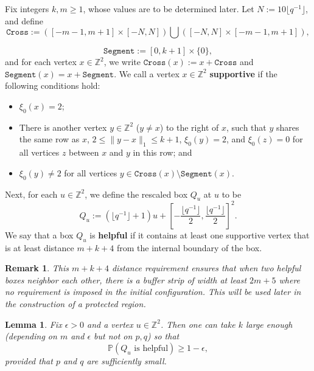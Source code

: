\documentclass{article}
\renewcommand{\P}{\mathbb{P}}
\newcommand{\bZ}{{\mathbb Z}}
\numberwithin{equation}{section}
\newtheorem{lemma}[theorem]{Lemma}
\newtheorem{remark}[theorem]{Remark}
\begin{document}
Fix integers $k, m \geq 1$, whose values are to be determined later.
Let $N := 10\lfloor q^{-1} \rfloor$, and define 
\[
\texttt{Cross}
:= 
\left([-m-1, m+1] \times \left[-N, N\right] \right) \bigcup \left(\left[-N, N\right] \times [-m-1, m+1]\right),
\]

\[
\texttt{Segment}
:=
 [0, k + 1]\times \{0\},
\]
and for each vertex $x \in \bZ^2$, we write $\texttt{Cross}(x) := x + \texttt{Cross}$ and $\texttt{Segment}(x) = x + \texttt{Segment}$.
We call a vertex $x \in \bZ^2$ \textbf{supportive} if the following conditions hold: 
\begin{itemize}[leftmargin=1cm]
    \item [(SV1)]
    $\xi_0(x) = 2$;

    \item [(SV2)]
    There is another vertex $y \in \bZ^2$ ($y \neq x$) to the right of $x$, such that $y$ shares the same row as $x$, $2\le\|y - x\|_1 \leq k + 1$, $\xi_0(y) = 2$, and $\xi_0(z) = 0$ for all vertices $z$ between $x$ and $y$ in this row; and

    \item [(SV3)]
    $\xi_0(y) \neq 2$ for all vertices $y \in \texttt{Cross}(x) \setminus \texttt{Segment}(x)$.
\end{itemize}
Next, for each $u \in \bZ^2$, we define the rescaled box $Q_u$ at $u$ to be 
\[
Q_u := \left(\lfloor q^{-1} \rfloor + 1 \right) u + \left[-\frac{\lfloor q^{-1}\rfloor}{2}, \frac{\lfloor q^{-1}\rfloor}{2}\right]^2.
\]
We say that a box $Q_u$ is \textbf{helpful} if it contains at least one supportive vertex that is at least distance $m + k + 4$ from the internal boundary of the box.
\begin{remark}
\label{rmk:bufferstrip}
    This $m + k + 4$ distance requirement ensures that when two helpful boxes neighbor each other, there is a buffer strip of width at least $2m + 5$ where no requirement is imposed in the initial configuration. 
    This will be used later in the construction of a protected region.
\end{remark}


\begin{lemma}\label{lem:searchinggoodvertices}
    Fix $\epsilon > 0$ and a vertex $u \in \bZ^2$.
    Then one can take $k$ large enough (depending on $m$ and $\epsilon$ but not on $p,q$) so that
    \[
    \P(Q_u \text{ is helpful}) \geq 1 - \epsilon,
    \]
    provided that $p$ and $q$ are sufficiently small.
\end{lemma}
\end{document}
